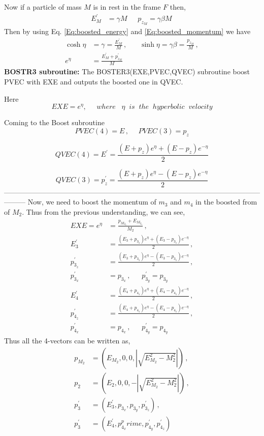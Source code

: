 \documentclass[12pt]{article}
\begin{document}
{{Now if a particle of mass $M$ is in rest in the frame $F$ then,
\begin{align}
    E^\prime_M &= \gamma M \, ~~~~~~  p_{z_M} = \gamma \beta M \,
\end{align}
Then by using Eq. \ref{Eq:boosted_energy} and \ref{Eq:boosted_momentum} we have
\begin{align}
    \cosh{\eta} &= \gamma = \frac{E^\prime_M}{M} \,, ~~~~~~~~ \sinh{\eta}   = \gamma \beta = \frac{p_{z_M}}{M} \,,\\
    e^\eta &= \frac{E^\prime_M + p_{z_M}^\prime}{M}
\end{align}
\textbf{ BOSTR3 subroutine:} The BOSTER3(EXE,PVEC,QVEC) subroutine boost PVEC with EXE and outputs the boosted one in QVEC.

Here \[EXE = e^\eta, \;\;\;\;\; where \;\;\; \eta \;\; is \;\;  the \;\; hyperbolic \;\; velocity\]

Coming to the Boost subroutine
\[PVEC(4) = E \,, ~~~~~~ PVEC(3) = p_z\]

\[QVEC(4) = E^{'} =  \frac{(E+p_z)e^\eta + (E-p_z)e^{-\eta}}{2}\]

\[QVEC(3) = p_z^{'} =  \frac{(E+p_z)e^\eta - (E-p_z)e^{-\eta}}{2}\]
---------------------------------------------------------------------------------------------------------------------
Now, we need to boost the momentum of $m_3$ and $m_4$ in the boosted from of $M_2$. Thus from the previous understanding, we can see,
\begin{align}
    EXE= e^\eta &=\frac{p_{M_{2_z}} + E_{M_{2_z}}}{M_2} \,,\\
    E_3^\prime &= \frac{(E_3 + p_{3_z}) e^\eta + (E_3 - p_{3_z})e^{-\eta}}{2} \,,\\
    p_{3_z}^\prime &= \frac{(E_3 + p_{3_z}) e^\eta - (E_3 - p_{3_z})e^{-\eta}}{2} \,, \\
    p_{3_x}^\prime &= p_{3_x} \,, ~~~~~~~ p_{3_y}^\prime = p_{3_y} \\
    E_4^\prime &= \frac{(E_4 + p_{4_z}) e^\eta + (E_4 - p_{4_z})e^{-\eta}}{2} \,,\\
    p_{4_z}^\prime &= \frac{(E_4 + p_{4_z}) e^\eta - (E_4 - p_{4_z})e^{-\eta}}{2} \,, \\
    p_{4_x}^\prime &= p_{4_x} \,, ~~~~~~~ p_{4_y}^\prime = p_{4_y}
\end{align}
Thus all the 4-vectors can be written as,
\begin{align}
\label{Eq:m_3_rest_frame}
    p_{M_2} &=(E_{M_2}, 0 , 0 ,|\sqrt{E_{M_2}^2 - M_2^2}|) \,,\\
    p_{2} & = (E_2, 0, 0, - |\sqrt{E_{M_2}^2 - M_2^2}|) \,, \\
    p_3^\prime & = (E_3^\prime, p_{3_x},  p_{3_y} , p_{3_z}^\prime) \,,\\
    p_3^\prime & = (E_4^\prime,  p_{4_x}^prime,  p_{4_y}^\prime, p_{4_z}^\prime)
\end{align}

}}
\end{document}
